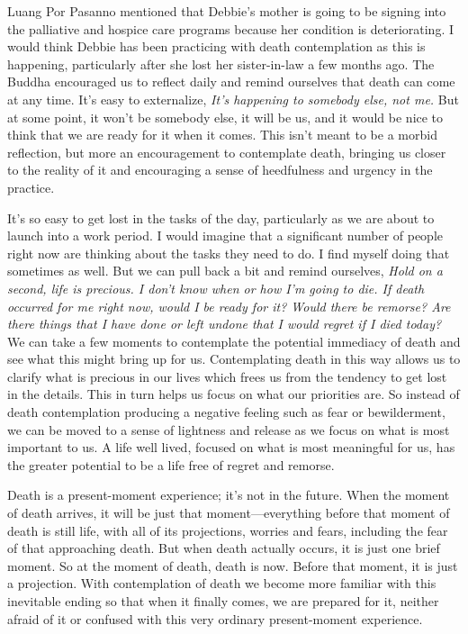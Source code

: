 
Luang Por Pasanno mentioned that Debbie's mother is going to be signing 
into the palliative and hospice care programs because her condition is 
deteriorating. I would think Debbie has been practicing with death 
contemplation as this is happening, particularly after she lost her 
sister-in-law a few months ago. The Buddha encouraged us to reflect 
daily and remind ourselves that death can come at any time. It's easy 
to externalize, \emph{It's happening to somebody else, not me.} But at 
some point, it won't be somebody else, it will be us, and it would be 
nice to think that we are ready for it when it comes. This isn't meant 
to be a morbid reflection, but more an encouragement to contemplate 
death, bringing us closer to the reality of it and encouraging a sense 
of heedfulness and urgency in the practice.

It's so easy to get lost in the tasks of the day, particularly as we 
are about to launch into a work period. I would imagine that a 
significant number of people right now are thinking about the tasks 
they need to do. I find myself doing that sometimes as well. But we can 
pull back a bit and remind ourselves, \emph{Hold on a second, life is 
precious. I don't know when or how I'm going to die. If death occurred 
for me right now, would I be ready for it? Would there be remorse? Are 
there things that I have done or left undone that I would regret if I 
died today?} We can take a few moments to contemplate the potential 
immediacy of death and see what this might bring up for us. 
Contemplating death in this way allows us to clarify what is precious 
in our lives which frees us from the tendency to get lost in the 
details. This in turn helps us focus on what our priorities are. So 
instead of death contemplation producing a negative feeling such as 
fear or bewilderment, we can be moved to a sense of lightness and 
release as we focus on what is most important to us. A life well lived, 
focused on what is most meaningful for us, has the greater potential to 
be a life free of regret and remorse.

Death is a present-moment experience; it's not in the future. When the 
moment of death arrives, it will be just that moment---everything 
before that moment of death is still life, with all of its projections, 
worries and fears, including the fear of that approaching death. But 
when death actually occurs, it is just one brief moment. So at the 
moment of death, death is now. Before that moment, it is just a 
projection. With contemplation of death we become more familiar with 
this inevitable ending so that when it finally comes, we are prepared 
for it, neither afraid of it or confused with this very ordinary 
present-moment experience.

